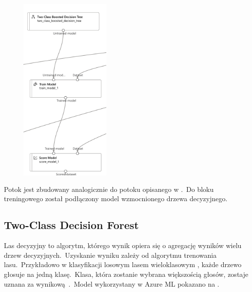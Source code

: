 \begin{figure}[H]
    \centering
    \includegraphics[width=0.4\textwidth]{images/dt_pipe}
    \label{fig:dt-pipe}
\end{figure}

Potok jest zbudowany analogicznie do potoku opisanego w .\ Do bloku treningowego został podłączony model wzmocnionego drzewa decyzyjnego.

\subsection{Two-Class Decision Forest}
Las decyzyjny to algorytm, którego wynik opiera się o agregację wyników wielu drzew decyzyjnych.\ Uzyskanie wyniku zależy od algorytmu trenowania lasu.\ Przykładowo w klasyfikacji losowym lasem wieloklasowym , każde drzewo głosuje na jedną klasę.\ Klasa, która zostanie wybrana większością głosów, zostaje uznana za wynikową~\cite{Google}.\ Model wykorzystany w Azure ML pokazano na .

